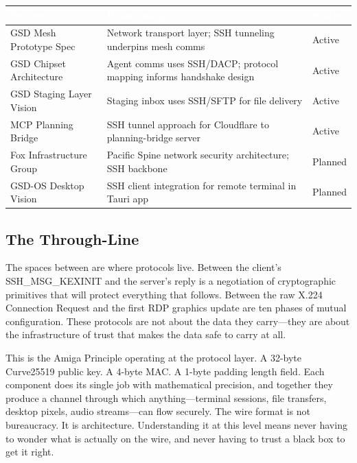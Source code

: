 \documentclass[11pt,letterpaper]{article}
\newcommand{\tableheader}[1]{\textbf{\sffamily\textcolor{white}{#1}}}
\begin{document}
\begin{center}
\begin{tabularx}{\textwidth}{L{3.5cm}XC{2cm}}
\toprule
{}
\tableheader{Document} & \tableheader{Relationship} & \tableheader{Status} \\
\midrule
GSD Mesh Prototype Spec & Network transport layer; SSH tunneling underpins mesh comms & Active \\
GSD Chipset Architecture & Agent comms uses SSH/DACP; protocol mapping informs handshake design & Active \\
GSD Staging Layer Vision & Staging inbox uses SSH/SFTP for file delivery & Active \\
MCP Planning Bridge & SSH tunnel approach for Cloudflare to planning-bridge server & Active \\
Fox Infrastructure Group & Pacific Spine network security architecture; SSH backbone & Planned \\
GSD-OS Desktop Vision & SSH client integration for remote terminal in Tauri app & Planned \\
\bottomrule
\end{tabularx}
\end{center}

\subsection{The Through-Line}

The spaces between are where protocols live. Between the client's SSH\_MSG\_KEXINIT and the server's reply is a negotiation of cryptographic primitives that will protect everything that follows. Between the raw X.224 Connection Request and the first RDP graphics update are ten phases of mutual configuration. These protocols are not about the data they carry---they are about the infrastructure of trust that makes the data safe to carry at all.

This is the Amiga Principle operating at the protocol layer. A 32-byte Curve25519 public key. A 4-byte MAC. A 1-byte padding length field. Each component does its single job with mathematical precision, and together they produce a channel through which anything---terminal sessions, file transfers, desktop pixels, audio streams---can flow securely. The wire format is not bureaucracy. It is architecture. Understanding it at this level means never having to wonder what is actually on the wire, and never having to trust a black box to get it right.
\end{document}
